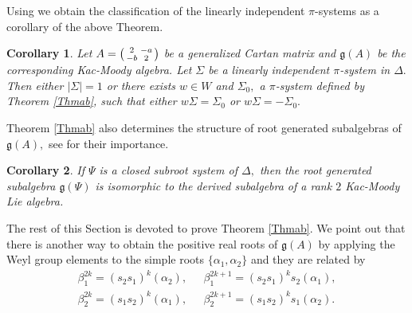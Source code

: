 \documentclass[12pt,reqno]{amsart}
\theoremstyle{plain}
\newtheorem{cor}{Corollary}%
\theoremstyle{definition}
\theoremstyle{remark}
\newcommand{\lie}[1]{\mathfrak{#1}}
\begin{document}
Using \cite[Theorem 3.1]{carbone2021varvec} we obtain the classification of the linearly independent $\pi$-systems as a corollary of the above Theorem.
\begin{cor}
    Let $A= \begin{psmallmatrix} 2 & -a \\-b & 2 \end{psmallmatrix}$ be a generalized Cartan matrix and $\lie g(A)$ be the corresponding Kac-Moody algebra. Let $\Sigma$ be a linearly independent $\pi$-system in $\Delta.$ Then either $|\Sigma|=1$ or there exists $w\in W$ and $\Sigma_0,$ a $\pi$-system defined by Theorem \ref{Thmab}, such that either $w\Sigma=\Sigma_0$ or $w\Sigma=-\Sigma_0.$ 
\end{cor}
Theorem \ref{Thmab} also determines the structure of root generated subalgebras of $\lie g(A),$ see \cite{carbone2021varvec,habib2023root} for their importance.
\begin{cor}
    If $\Psi$ is a closed subroot system of $\Delta,$ then the root generated subalgebra $\lie g(\Psi)$ is isomorphic to the derived subalgebra of a rank $2$ Kac-Moody Lie algebra.
\end{cor}


The rest of this Section is devoted to prove Theorem \ref{Thmab}. We point out that there is another way to obtain the positive real roots of $\lie g(A)$ by applying the Weyl group elements to the simple roots $\{\alpha_1,\alpha_2\}$ and they are related by  
\begin{equation}\label{rootfourtypes}
    \begin{split}
        \beta_{1}^{2k}=(s_2s_1)^k(\alpha_2),\ \ & \ \beta_{1}^{2k+1}=(s_2s_1)^ks_2(\alpha_1),\\
        \beta_{2}^{2k}=(s_1s_2)^k(\alpha_1),\ \ & \ \beta_{2}^{2k+1}=(s_1s_2)^ks_1(\alpha_2).
    \end{split}
\end{equation}

\end{document}
